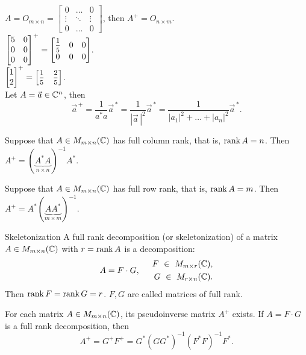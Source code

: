     \Ex $A = O_{m\times n} = \begin{bmatrix}
        0 & \ldots & 0\\
        \vdots & \ddots & \vdots\\
        0 & \ldots & 0
    \end{bmatrix}$, then $A^+ = O_{n\times m}$.\\
    \Ex $\begin{bmatrix}
        5 & 0 \\
        0 & 0 \\
        0 & 0
    \end{bmatrix}^+ = \displaystyle\begin{bmatrix}
        \medmath{\frac{1}{5}} & 0 & 0\\
        0 & 0 & 0
    \end{bmatrix}$.\\
    \Ex $\begin{bmatrix}
        1 \\ 2
    \end{bmatrix}^+ = \begin{bmatrix}
        \medmath{\frac{1}{5}} & \medmath{\frac{2}{5}}
    \end{bmatrix}$.\\
    \Ex Let $A = \vec{a} \in \mathbb{C}^n$, then
    \[\vec{a}^{\, +} = \dfrac{1}{a^*a}\vec{a}^{\, *} 
                     = \dfrac{1}{|\vec{a}\,|^2}\vec{a}^{\, *}
                     = \dfrac{1}{|a_1|^2 + \ldots + |a_n|^2} \vec{a}^{\, *}.\]
    \begin{proposition}{}{}
        Suppose that $A \in M_{m\times n}(\mathbb{C})$ has full column rank, that is, $\operatorname{rank} A = n$. Then
        $A^+ = (\underbrace{A^*A}_{n\times n})^{-1}A^*.$
    \end{proposition}
    \begin{proposition}{}{}
        Suppose that $A \in M_{m\times n}(\mathbb{C})$ has full row rank, that is, $\operatorname{rank} A = m$. Then $A^+ = A^* (\underbrace{AA^*}_{m\times m})^{-1}.$
    \end{proposition}
    
    \begin{definition}{Skeletonization}{}
        A full rank decomposition (or skeletonization) of a matrix $A \in M_{m\times n}(\mathbb{C})$ with $r = \operatorname{rank} A$ is a decomposition:
        \[
            A = F \cdot G, \hspace*{0.5cm} \begin{aligned}
                F\ \in \ M_{m\times r}(\mathbb{C}),\\
                G\ \in \ M_{r\times n}(\mathbb{C}).
            \end{aligned}  
        \]
        Then $\operatorname{rank} F = \operatorname{rank} G = r$. $F, G$ are called matrices of full rank.
    \end{definition}
    \begin{theorema}{}{}
        For each matrix $A \in M_{m\times n}(\mathbb{C})$, its pseudoinverse matrix $A^+$ exists. If $A = F \cdot G$ is a full rank decomposition, then
        \[
            A^+ = G^+F^+ = G^*\left(G  G^*\right)^{-1} \left(F^*F\right)^{-1}F^*. 
        \]
    \end{theorema}